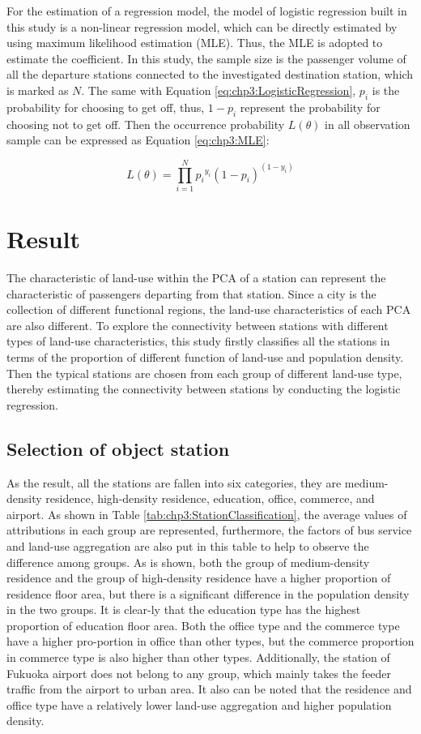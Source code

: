 %
For the estimation of a regression model, the model of logistic regression built in this study is a non-linear regression model, which can be directly estimated by using maximum likelihood estimation (MLE). Thus, the MLE is adopted to estimate the coefficient. In this study, the sample size is the passenger volume of all the departure stations connected to the investigated destination station, which is marked as $N$. The same with Equation \ref{eq:chp3:LogisticRegression}, $p_i$ is the probability for choosing to get off, thus, $1-p_i$ represent the probability for choosing not to get off. Then the occurrence probability $L(\theta)$ in all observation sample can be expressed as Equation \ref{eq:chp3:MLE}:

\begin{equation}
	L(\theta)=\prod_{i=1}^{N}{p_i}^{y_i}(1-p_i)^{(1-y_i)}
	\label{eq:chp3:MLE}
\end{equation}

\section{Result}
%
The characteristic of land-use within the PCA of a station can represent the characteristic of passengers departing from that station. Since a city is the collection of different functional regions, the land-use characteristics of each PCA are also different. To explore the connectivity between stations with different types of land-use characteristics, this study firstly classifies all the stations in terms of the proportion of different function of land-use and population density. Then the typical stations are chosen from each group of different land-use type, thereby estimating the connectivity between stations by conducting the logistic regression. 

\subsection{Selection of object station}
%
As the result, all the stations are fallen into six categories, they are medium-density residence, high-density residence, education, office, commerce, and airport. As shown in Table \ref{tab:chp3:StationClassification}, the average values of attributions in each group are represented, furthermore, the factors of bus service and land-use aggregation are also put in this table to help to observe the difference among groups. As is shown, both the group of medium-density residence and the group of high-density residence have a higher proportion of residence floor area, but there is a significant difference in the population density in the two groups. It is clear-ly that the education type has the highest proportion of education floor area. Both the office type and the commerce type have a higher pro-portion in office than other types, but the commerce proportion in commerce type is also higher than other types. Additionally, the station of Fukuoka airport does not belong to any group, which mainly takes the feeder traffic from the airport to urban area. It also can be noted that the residence and office type have a relatively lower land-use aggregation and higher population density.

